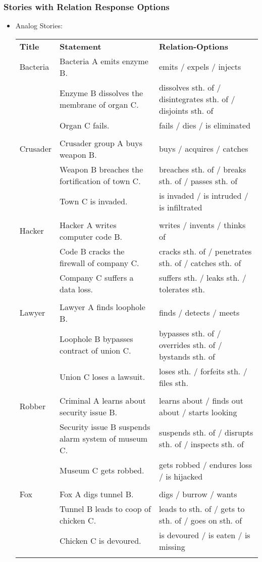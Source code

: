 \subsubsection{Stories with Relation Response Options}
\begin{itemize}
\item Analog Stories:
\scriptsize
\begin{longtable}{p{}p{}p{}}
\textbf{Title} & \textbf{Statement} &\textbf{Relation-Options}\\
Bacteria & Bacteria A emits enzyme B. & emits / expels / injects \\   & Enzyme B dissolves the membrane of organ C. & dissolves sth. of / disintegrates sth. of / disjoints sth. of \\   & Organ C fails. & fails / dies / is eliminated \\  & & \\ Crusader & Crusader group A buys weapon B. & buys / acquires / catches \\   & Weapon B breaches the fortification of town C. & breaches sth. of / breaks sth. of / passes sth. of \\   & Town C is invaded. & is invaded / is intruded / is infiltrated \\  & & \\ Hacker & Hacker A writes computer code B. & writes / invents / thinks of \\   & Code B cracks the firewall of company C. & cracks sth. of / penetrates sth. of / catches sth. of \\   & Company C suffers a data loss. & suffers sth. / leaks sth. / tolerates sth. \\  & & \\ Lawyer & Lawyer A finds loophole B. & finds / detects / meets \\   & Loophole B bypasses contract of union C. & bypasses sth. of / overrides sth. of / bystands sth. of \\   & Union C loses a lawsuit. & loses sth. / forfeits sth. / files sth. \\  & & \\ Robber & Criminal A learns about security issue B. & learns about / finds out about / starts looking \\   & Security issue B suspends alarm system of museum C. & suspends sth. of / disrupts sth. of / inspects sth. of \\   & Museum C gets robbed. & gets robbed / endures loss / is hijacked \\  & & \\ Fox & Fox A digs tunnel B. & digs / burrow / wants \\   & Tunnel B leads to coop of chicken C. & leads to sth. of / gets to sth. of / goes on sth. of \\   & Chicken C is devoured. & is devoured / is eaten / is missing \\  & & \\

\end{longtable}
\end{itemize}
